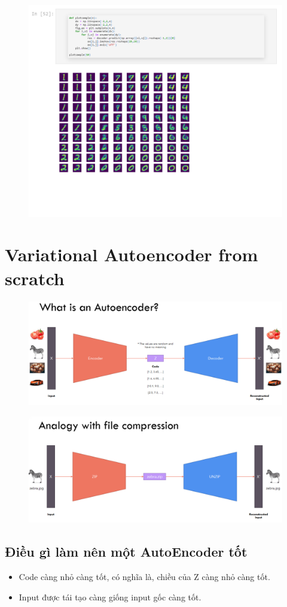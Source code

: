 \documentclass{book}
\begin{document}
\begin{figure}[H]
	\centering
	\includegraphics[width=0.75\linewidth]{images/au25.png}
\end{figure}
\chapter{Variational Autoencoder from scratch}

\begin{figure}[H]
    \centering
    \includegraphics[width=0.75\linewidth]{images/VAE_1.png}
\end{figure}

\begin{figure}[H]
    \centering
    \includegraphics[width=0.75\linewidth]{images/VAE_2.png}
\end{figure}

\section{Điều gì làm nên một AutoEncoder tốt}
\begin{itemize}
    \item Code càng nhỏ càng tốt, có nghĩa là, chiều của Z càng nhỏ càng tốt.
    \item Input được tái tạo càng giống input gốc càng tốt.
\end{itemize}
\end{document}
